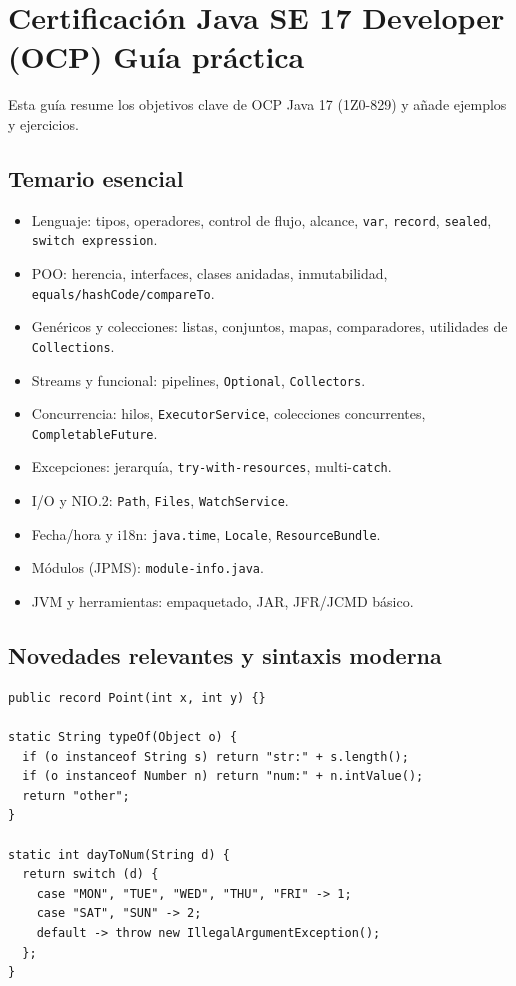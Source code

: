 \documentclass[11pt,a4paper]{article}
\begin{document}
\section{Certificación Java SE 17 Developer (OCP) \textemdash{} Guía práctica}
Esta guía resume los objetivos clave de OCP Java 17 (1Z0-829) y añade ejemplos y ejercicios.

\subsection{Temario esencial}
\begin{itemize}[leftmargin=*]
  \item Lenguaje: tipos, operadores, control de flujo, alcance, \texttt{var}, \texttt{record}, \texttt{sealed}, \texttt{switch expression}.
  \item POO: herencia, interfaces, clases anidadas, inmutabilidad, \texttt{equals/hashCode/compareTo}.
  \item Genéricos y colecciones: listas, conjuntos, mapas, comparadores, utilidades de \texttt{Collections}.
  \item Streams y funcional: pipelines, \texttt{Optional}, \texttt{Collectors}.
  \item Concurrencia: hilos, \texttt{ExecutorService}, colecciones concurrentes, \texttt{CompletableFuture}.
  \item Excepciones: jerarquía, \texttt{try-with-resources}, multi-\texttt{catch}.
  \item I/O y NIO.2: \texttt{Path}, \texttt{Files}, \texttt{WatchService}.
  \item Fecha/hora y i18n: \texttt{java.time}, \texttt{Locale}, \texttt{ResourceBundle}.
  \item Módulos (JPMS): \texttt{module-info.java}.
  \item JVM y herramientas: empaquetado, JAR, JFR/JCMD básico.
\end{itemize}

\subsection{Novedades relevantes y sintaxis moderna}
\begin{lstlisting}[style=javastyle, caption={Record, pattern matching y switch expression}]
public record Point(int x, int y) {}

static String typeOf(Object o) {
  if (o instanceof String s) return "str:" + s.length();
  if (o instanceof Number n) return "num:" + n.intValue();
  return "other";
}

static int dayToNum(String d) {
  return switch (d) {
    case "MON", "TUE", "WED", "THU", "FRI" -> 1;
    case "SAT", "SUN" -> 2;
    default -> throw new IllegalArgumentException();
  };
}
\end{lstlisting}
\end{document}
